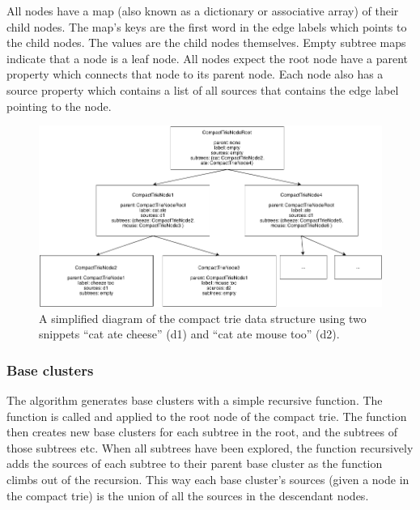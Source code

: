 All nodes have a map (also known as a dictionary or associative array) of their child nodes. The map's keys are the first word in the edge labels which points to the child nodes. The values are the child nodes themselves. Empty subtree maps indicate that a node is a leaf node. All nodes expect the root node have a parent property which connects that node to its parent node. Each node also has a source property which contains a list of all sources that contains the edge label pointing to the node.

\begin{figure}[!ht]
  \begin{center}
    \includegraphics[totalheight=0.3\textheight]{Figures/compacttriedatastructure}
  \end{center}
  \caption{A simplified diagram of the compact trie data structure using two snippets “cat ate cheese” (d1) and “cat ate mouse too” (d2).}
  \label{fig:compacttriedatastructure}
\end{figure}

\subsubsection{Base clusters}
\label{subsubsec:baseclusters}
The \CTC algorithm generates base clusters with a simple recursive function. The function is called and applied to the root node of the compact trie. The function then creates new base clusters for each subtree in the root, and the subtrees of those subtrees etc. When all subtrees have been explored, the function recursively adds the sources of each subtree to their parent base cluster as the function climbs out of the recursion. This way each base cluster's sources (given a node in the compact trie) is the union of all the sources in the descendant nodes.

